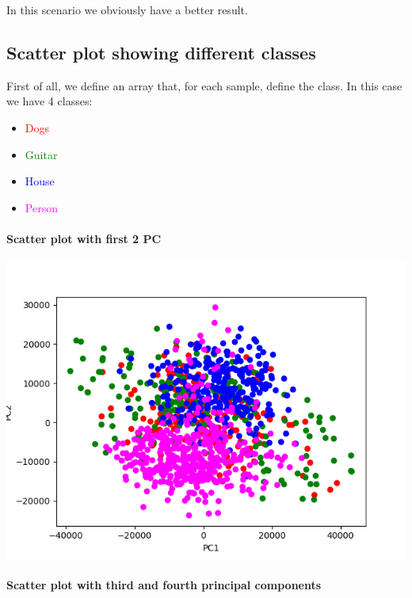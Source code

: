 \documentclass{report}
\begin{document}
  In this scenario we obviously have a better result.

  \subsection{Scatter plot showing different classes}
  First of all, we define an array that, for each sample, define the class.
  In this case we have 4 classes:
  \begin{itemize}
  \item[\textcolor{red}{\textbullet}] \textcolor{red}{Dogs}
  \item[\textcolor{green}{\textbullet}]\textcolor{green}{Guitar}
  \item[\textcolor{blue}{\textbullet}] \textcolor{blue}{House}
  \item[\textcolor{magenta}{\textbullet}] \textcolor{magenta}{Person}
  \end{itemize}

  \pagebreak

  \paragraph{Scatter plot with first 2 PC}

  \includegraphics{img_03}

  \paragraph{Scatter plot with third and fourth principal components}
\end{document}
